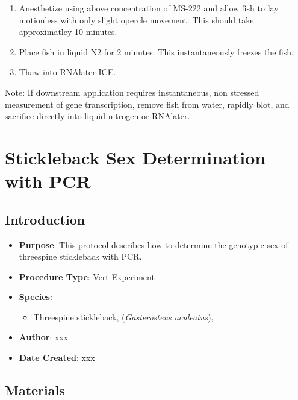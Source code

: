 \documentclass[
  letterpaper,
  DIV=11,
  numbers=noendperiod]{scrreprt}
\providecommand{\tightlist}{%
  \setlength{\itemsep}{0pt}\setlength{\parskip}{0pt}}\usepackage{longtable,booktabs,array}
\begin{document}
\begin{enumerate}
\def\labelenumi{\arabic{enumi}.}
\tightlist
\item
  Anesthetize using above concentration of MS-222 and allow fish to lay
  motionless with only slight opercle movement. This should take
  approximatley 10 minutes.
\item
  Place fish in liquid N2 for 2 minutes. This instantaneously freezes
  the fish.
\item
  Thaw into RNAlater-ICE.
\end{enumerate}

Note: If downstream application requires instantaneous, non stressed
measurement of gene transcription, remove fish from water, rapidly blot,
and sacrifice directly into liquid nitrogen or RNAlater.

\hypertarget{sec-vert_exp_SB_sex_PCR}{%
\chapter{Stickleback Sex Determination with
PCR}\label{sec-vert_exp_SB_sex_PCR}}

\hypertarget{introduction-59}{%
\section{Introduction}\label{introduction-59}}

\begin{itemize}
\tightlist
\item
  \textbf{Purpose}: This protocol describes how to determine the
  genotypic sex of threespine stickleback with PCR.
\item
  \textbf{Procedure Type}: Vert Experiment
\item
  \textbf{Species}:

  \begin{itemize}
  \tightlist
  \item
    Threespine stickleback, (\emph{Gasterosteus aculeatus}),
  \end{itemize}
\item
  \textbf{Author}: xxx
\item
  \textbf{Date Created}: xxx
\end{itemize}

\hypertarget{materials-55}{%
\section{Materials}\label{materials-55}}
\end{document}
